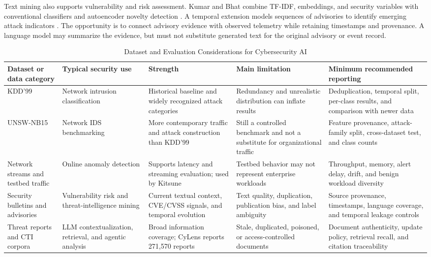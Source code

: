 \documentclass[conference]{IEEEtran}
\begin{document}
Text mining also supports vulnerability and risk assessment. Kumar and Bhat combine TF-IDF, embeddings, and security variables with conventional classifiers and autoencoder novelty detection \cite{KumarBhatRisk}. A temporal extension models sequences of advisories to identify emerging attack indicators \cite{KumarBhatTemporal}. The opportunity is to connect advisory evidence with observed telemetry while retaining timestamps and provenance. A language model may summarize the evidence, but must not substitute generated text for the original advisory or event record.

\begin{table}[t]
\caption{Dataset and Evaluation Considerations for Cybersecurity AI}
\label{tab:datasets}
\centering\scriptsize
\begin{tabularx}{\textwidth}{Y Y Y Y Y}
\toprule
Dataset or data category & Typical security use & Strength & Main limitation & Minimum recommended reporting\\
\midrule
KDD'99 & Network intrusion classification & Historical baseline and widely recognized attack categories & Redundancy and unrealistic distribution can inflate results \cite{Tavallaee2009} & Deduplication, temporal split, per-class results, and comparison with newer data\\
UNSW-NB15 & Network IDS benchmarking & More contemporary traffic and attack construction than KDD'99 & Still a controlled benchmark and not a substitute for organizational traffic \cite{Moustafa2015} & Feature provenance, attack-family split, cross-dataset test, and class counts\\
Network streams and testbed traffic & Online anomaly detection & Supports latency and streaming evaluation; used by Kitsune \cite{Mirsky2018} & Testbed behavior may not represent enterprise workloads & Throughput, memory, alert delay, drift, and benign workload diversity\\
Security bulletins and advisories & Vulnerability risk and threat-intelligence mining & Current textual context, CVE/CVSS signals, and temporal evolution \cite{KumarBhatRisk,KumarBhatTemporal} & Text quality, duplication, publication bias, and label ambiguity & Source provenance, timestamps, language coverage, and temporal leakage controls\\
Threat reports and CTI corpora & LLM contextualization, retrieval, and agentic analysis & Broad information coverage; CyLens reports 271,570 reports \cite{Liu2025} & Stale, duplicated, poisoned, or access-controlled documents & Document authenticity, update policy, retrieval recall, and citation traceability\\

\end{tabularx}
\end{table}
\end{document}
